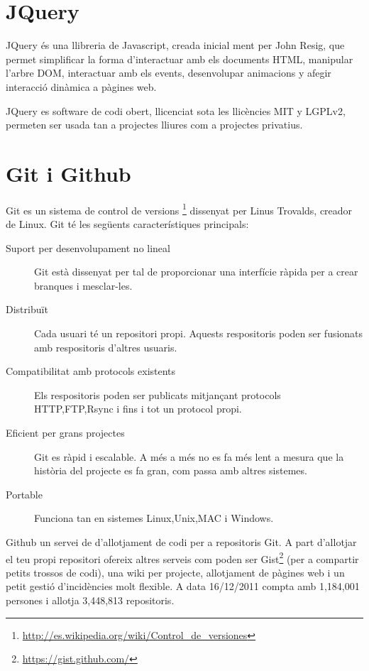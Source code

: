 \section{JQuery}

JQuery és una llibreria de Javascript, creada inicial ment per John Resig, que permet simplificar la forma d'interactuar amb els documents HTML, manipular l'arbre DOM, interactuar amb els events, desenvolupar animacions y afegir interacció dinàmica a pàgines web. 

JQuery es software de codi obert, llicenciat sota les llicències MIT y LGPLv2, permeten ser usada tan a projectes lliures com a projectes privatius. 

\section{Git i Github}

Git es un sistema de control de versions \footnote{\url{http://es.wikipedia.org/wiki/Control_de_versiones}} dissenyat per Linus Trovalds, creador de Linux. Git té les següents característiques principals: 

\begin{description}
    \item[Suport per desenvolupament no lineal] Git està dissenyat per tal de proporcionar una interfície ràpida per a crear branques i mesclar-les.
    \item[Distribuït] Cada usuari té un repositori propi. Aquests respositoris poden ser fusionats amb respositoris d'altres usuaris.
    \item[Compatibilitat amb protocols existents] Els respositoris poden ser publicats mitjançant protocols HTTP,FTP,Rsync i fins i tot un protocol propi.
    \item[Eficient per grans projectes] Git es ràpid i escalable. A més a més no es fa més lent a mesura que la història del projecte es fa gran, com passa amb altres sistemes.
    \item[Portable] Funciona tan en sistemes Linux,Unix,MAC i Windows.
\end{description}

Github un servei de d'allotjament de codi per a repositoris Git. A part d'allotjar el teu propi repositori ofereix altres serveis com poden ser Gist\footnote{\url{https://gist.github.com/}} (per a compartir petits trossos de codi), una wiki per projecte, allotjament de pàgines web i un petit gestió d'incidències molt flexible. A data 16/12/2011 compta amb 1,184,001 persones i allotja 3,448,813 repositoris.

